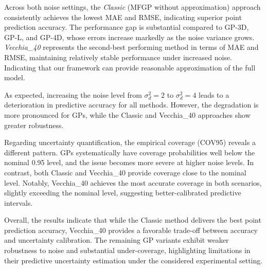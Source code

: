 \documentclass[12pt]{article}
\begin{document}
\noindent
\hangindent=-5mm
Across both noise settings, the \textit{Classic} (MFGP without approximation) approach consistently achieves the lowest MAE and RMSE, indicating superior point prediction accuracy. The performance gap is substantial compared to GP-3D, GP-L, and GP-4D, whose errors increase markedly as the noise variance grows. \textit{Vecchia\_40} represents the second-best performing method in terms of MAE and RMSE, maintaining relatively stable performance under increased noise. Indicating that our framework can provide reasonable approximation of the full model.

\noindent
\hangindent=-5mm
As expected, increasing the noise level from $\sigma_d^2 = 2$ to $\sigma_d^2 = 4$ leads to a deterioration in predictive accuracy for all methods. However, the degradation is more pronounced for GPs, while the Classic and Vecchia\_40 approaches show greater robustness.

\noindent
\hangindent=-5mm
Regarding uncertainty quantification, the empirical coverage (COV95) reveals a different pattern. GPs systematically have coverage probabilities well below the nominal 0.95 level, and the issue becomes more severe at higher noise levels. In contrast, both Classic and Vecchia\_40 provide coverage close to the nominal level. Notably, Vecchia\_40 achieves the most accurate coverage in both scenarios, slightly exceeding the nominal level, suggesting better-calibrated predictive intervals.

\noindent
\hangindent=-5mm
Overall, the results indicate that while the Classic method delivers the best point prediction accuracy, Vecchia\_40 provides a favorable trade-off between accuracy and uncertainty calibration. The remaining GP variants exhibit weaker robustness to noise and substantial under-coverage, highlighting limitations in their predictive uncertainty estimation under the considered experimental setting.
\end{document}
